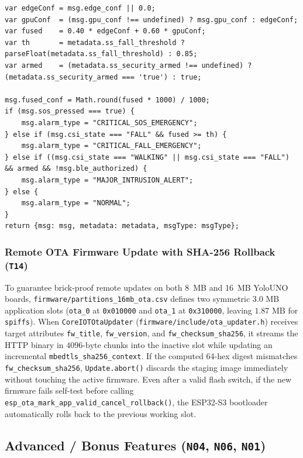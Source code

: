 \documentclass{hcmut-report}
\begin{document}
\begin{lstlisting}[caption={Core TBEL/JavaScript Decision Script Inside Node 3 of coreiot/rulechain\_fall\_sec.json},label={lst:rulechain_js}]
var edgeConf = msg.edge_conf || 0.0;
var gpuConf  = (msg.gpu_conf !== undefined) ? msg.gpu_conf : edgeConf;
var fused    = 0.40 * edgeConf + 0.60 * gpuConf;
var th       = metadata.ss_fall_threshold ? parseFloat(metadata.ss_fall_threshold) : 0.85;
var armed    = (metadata.ss_security_armed !== undefined) ? (metadata.ss_security_armed === 'true') : true;

msg.fused_conf = Math.round(fused * 1000) / 1000;
if (msg.sos_pressed === true) {
    msg.alarm_type = "CRITICAL_SOS_EMERGENCY";
} else if (msg.csi_state === "FALL" && fused >= th) {
    msg.alarm_type = "CRITICAL_FALL_EMERGENCY";
} else if ((msg.csi_state === "WALKING" || msg.csi_state === "FALL") && armed && !msg.ble_authorized) {
    msg.alarm_type = "MAJOR_INTRUSION_ALERT";
} else {
    msg.alarm_type = "NORMAL";
}
return {msg: msg, metadata: metadata, msgType: msgType};
\end{lstlisting}

\subsubsection[Remote OTA Firmware Update]{Remote OTA Firmware Update with SHA-256 Rollback (\texttt{T14})}
\label{sec:ota}

To guarantee brick-proof remote updates on both 8~MB and 16~MB YoloUNO boards, \texttt{firmware/\allowbreak partitions\_16mb\_ota.csv} defines two symmetric $3.0\text{ MB}$ application slots (\texttt{ota\_0} at \texttt{0x010000} and \texttt{ota\_1} at \texttt{0x310000}, leaving $1.87\text{ MB}$ for \texttt{spiffs}). When \texttt{CoreIOTOtaUpdater} (\texttt{firmware/\allowbreak include/\allowbreak ota\_updater.h}) receives target attributes \texttt{fw\_title}, \texttt{fw\_version}, and \texttt{fw\_checksum\_sha256}, it streams the HTTP binary in $4096\text{-byte}$ chunks into the inactive slot while updating an incremental \texttt{mbedtls\_sha256\_context}. If the computed 64-hex digest mismatches \texttt{fw\_checksum\_sha256}, \texttt{Update.abort()} discards the staging image immediately without touching the active firmware. Even after a valid flash switch, if the new firmware fails self-test before calling \texttt{esp\_ota\_mark\_app\_valid\_cancel\_rollback()}, the ESP32-S3 bootloader automatically rolls back to the previous working slot.

\subsection[Advanced Features (\texttt{N04}, \texttt{N06}, \texttt{N01})]{Advanced / Bonus Features (\texttt{N04}, \texttt{N06}, \texttt{N01})}
\label{sec:advanced_features}
\end{document}
